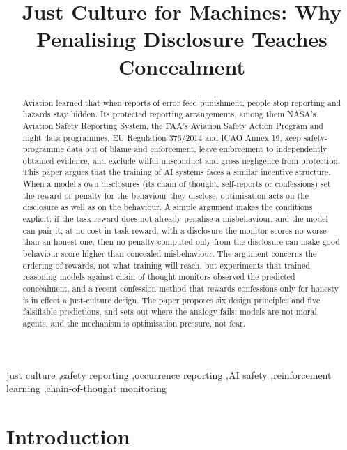 \documentclass[review,12pt]{elsarticle}
\begin{document}
\begin{frontmatter}
\title{Just Culture for Machines: Why Penalising Disclosure Teaches Concealment}
\begin{abstract}
Aviation learned that when reports of error feed punishment, people stop reporting and hazards stay hidden. Its protected reporting arrangements, among them NASA's Aviation Safety Reporting System, the FAA's Aviation Safety Action Program and flight data programmes, EU Regulation 376/2014 and ICAO Annex 19, keep safety-programme data out of blame and enforcement, leave enforcement to independently obtained evidence, and exclude wilful misconduct and gross negligence from protection. This paper argues that the training of AI systems faces a similar incentive structure. When a model's own disclosures (its chain of thought, self-reports or confessions) set the reward or penalty for the behaviour they disclose, optimisation acts on the disclosure as well as on the behaviour. A simple argument makes the conditions explicit: if the task reward does not already penalise a misbehaviour, and the model can pair it, at no cost in task reward, with a disclosure the monitor scores no worse than an honest one, then no penalty computed only from the disclosure can make good behaviour score higher than concealed misbehaviour. The argument concerns the ordering of rewards, not what training will reach, but experiments that trained reasoning models against chain-of-thought monitors observed the predicted concealment, and a recent confession method that rewards confessions only for honesty is in effect a just-culture design. The paper proposes six design principles and five falsifiable predictions, and sets out where the analogy fails: models are not moral agents, and the mechanism is optimisation pressure, not fear.
\end{abstract}
\begin{keyword}
just culture \sep safety reporting \sep occurrence reporting \sep AI safety \sep reinforcement learning \sep chain-of-thought monitoring
\end{keyword}
\end{frontmatter}
\linenumbers
\setlength{\emergencystretch}{2em}

\section{Introduction}\label{sec:intro}
\end{document}
